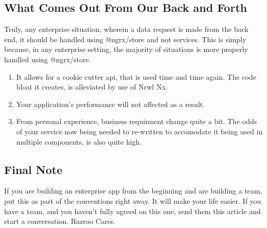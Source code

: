 \subsection{ What Comes Out From Our Back and Forth }
Truly, any enterprise situation, wherein a data request is made from the
back end, it should be handled using @ngrx/store and not services. This is
simply because, in any enterprise setting, the majority of situations is more
properly handled using @ngrx/store.
\begin{enumerate}
  \item It allows for a cookie cutter api, that is used time and time again. The
  code bloat it creates, is alleviated by use of Nrwl Nx.
  \item Your application's performance will not affected as a result.
  \item From personal experience, business requirment change quite a bit. The
odds of your service now being needed to re-written to accomodate it being
used in multiple components, is also quite high.
\end{enumerate}

\subsection{ Final Note }
If you are building an enterprise app from the beginning and are building a
team, put this as part of the conventions right away. It will make your life
easier. If you have a team, and you haven't fully agreed on this one, send them
this article and start a conversation. Razroo Cares.
